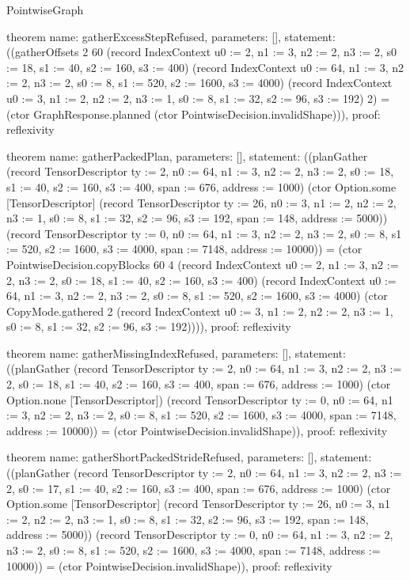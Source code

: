 \begin{lexlean}{PointwiseGraph}
\begin{semanticmodule}
theorem{
  name: gatherExcessStepRefused,
  parameters: [],
  statement: ((gatherOffsets 2 60 (record IndexContext {u0 := 2, n1 := 3, n2 := 2, n3 := 2, s0 := 18, s1 := 40, s2 := 160, s3 := 400}) (record IndexContext {u0 := 64, n1 := 3, n2 := 2, n3 := 2, s0 := 8, s1 := 520, s2 := 1600, s3 := 4000}) (record IndexContext {u0 := 3, n1 := 2, n2 := 2, n3 := 1, s0 := 8, s1 := 32, s2 := 96, s3 := 192}) 2) = (ctor GraphResponse.planned (ctor PointwiseDecision.invalidShape))),
  proof: reflexivity{}
}

theorem{
  name: gatherPackedPlan,
  parameters: [],
  statement: ((planGather (record TensorDescriptor {ty := 2, n0 := 64, n1 := 3, n2 := 2, n3 := 2, s0 := 18, s1 := 40, s2 := 160, s3 := 400, span := 676, address := 1000}) (ctor Option.some [TensorDescriptor] (record TensorDescriptor {ty := 26, n0 := 3, n1 := 2, n2 := 2, n3 := 1, s0 := 8, s1 := 32, s2 := 96, s3 := 192, span := 148, address := 5000})) (record TensorDescriptor {ty := 0, n0 := 64, n1 := 3, n2 := 2, n3 := 2, s0 := 8, s1 := 520, s2 := 1600, s3 := 4000, span := 7148, address := 10000})) = (ctor PointwiseDecision.copyBlocks 60 4 (record IndexContext {u0 := 2, n1 := 3, n2 := 2, n3 := 2, s0 := 18, s1 := 40, s2 := 160, s3 := 400}) (record IndexContext {u0 := 64, n1 := 3, n2 := 2, n3 := 2, s0 := 8, s1 := 520, s2 := 1600, s3 := 4000}) (ctor CopyMode.gathered 2 (record IndexContext {u0 := 3, n1 := 2, n2 := 2, n3 := 1, s0 := 8, s1 := 32, s2 := 96, s3 := 192})))),
  proof: reflexivity{}
}

theorem{
  name: gatherMissingIndexRefused,
  parameters: [],
  statement: ((planGather (record TensorDescriptor {ty := 2, n0 := 64, n1 := 3, n2 := 2, n3 := 2, s0 := 18, s1 := 40, s2 := 160, s3 := 400, span := 676, address := 1000}) (ctor Option.none [TensorDescriptor]) (record TensorDescriptor {ty := 0, n0 := 64, n1 := 3, n2 := 2, n3 := 2, s0 := 8, s1 := 520, s2 := 1600, s3 := 4000, span := 7148, address := 10000})) = (ctor PointwiseDecision.invalidShape)),
  proof: reflexivity{}
}

theorem{
  name: gatherShortPackedStrideRefused,
  parameters: [],
  statement: ((planGather (record TensorDescriptor {ty := 2, n0 := 64, n1 := 3, n2 := 2, n3 := 2, s0 := 17, s1 := 40, s2 := 160, s3 := 400, span := 676, address := 1000}) (ctor Option.some [TensorDescriptor] (record TensorDescriptor {ty := 26, n0 := 3, n1 := 2, n2 := 2, n3 := 1, s0 := 8, s1 := 32, s2 := 96, s3 := 192, span := 148, address := 5000})) (record TensorDescriptor {ty := 0, n0 := 64, n1 := 3, n2 := 2, n3 := 2, s0 := 8, s1 := 520, s2 := 1600, s3 := 4000, span := 7148, address := 10000})) = (ctor PointwiseDecision.invalidShape)),
  proof: reflexivity{}
}


\end{semanticmodule}
\end{lexlean}
